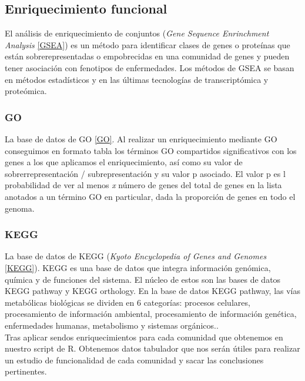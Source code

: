 \subsection{Enriquecimiento funcional}

El análisis de enriquecimiento de conjuntos (\textit{Gene Sequence Enrinchment Analysis} \ref{GSEA}) es un método para identificar clases de genes o proteínas que están sobrerepresentadas o empobrecidas en una comunidad de genes y pueden tener asociación con fenotipos de enfermedades. Los métodos de GSEA se basan en métodos estadísticos y en las últimas tecnologías de transcriptómica y proteómica.

\subsubsection{GO}
La base de datos de GO \ref{GO}. Al realizar un enriquecimiento mediante GO conseguimos en formato tabla los términos GO compartidos significativos con los genes a los que aplicamos el enriquecimiento, así como su valor de sobrerrepresentación / subrepresentación y su valor p asociado. El valor p es l probabilidad de ver al menos \textit{x} número de genes del total de genes en la lista anotados a un término GO en particular, dada la proporción de genes en todo el genoma. \\

\subsubsection{KEGG}
La base de datos de KEGG (\textit{Kyoto Encyclopedia of Genes and Genomes} \ref{KEGG}). KEGG es una base de datos que integra información genómica, química y de funciones del sistema. El núcleo de estos son las bases de datos KEGG pathway y KEGG orthology. En la base de datos KEGG pathway, las vías metabólicas biológicas se dividen en 6 categorías: procesos celulares, procesamiento de información ambiental, procesamiento de información genética, enfermedades humanas, metabolismo y sistemas orgánicos.\cite{KEGGpathway}. \\

Tras aplicar sendos enriquecimientos para cada comunidad que obtenemos en nuestro script de R. Obtenemos datos tabulador que nos serán útiles para realizar un estudio de funcionalidad de cada comunidad y sacar las conclusiones pertinentes.